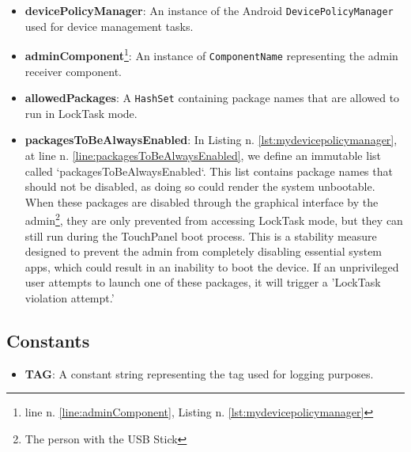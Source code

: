 \begin{itemize}
  \item \textbf{devicePolicyManager}: An instance of the Android \texttt{DevicePolicyManager} used for device management tasks.

  \item \textbf{adminComponent}\footnote{\label{adminComponentLine}line n. \ref{line:adminComponent}, Listing n. \ref{lst:mydevicepolicymanager}}:  An instance of \texttt{ComponentName} representing the admin receiver component.

  \item \textbf{allowedPackages}: A \texttt{HashSet} containing package names that are allowed to run in LockTask mode.
  \item \textbf{packagesToBeAlwaysEnabled}: In Listing n. \ref{lst:mydevicepolicymanager}, at line n. \ref{line:packagesToBeAlwaysEnabled}, we define an immutable list called `packagesToBeAlwaysEnabled`. This list contains package names that should not be disabled, as doing so could render the system unbootable. When these packages are disabled through the graphical interface by the admin\footnote{\label{administrator}The person with the USB Stick}, they are only prevented from accessing LockTask mode, but they can still run during the TouchPanel boot process. This is a stability measure designed to prevent the admin from completely disabling essential system apps, which could result in an inability to boot the device. If an unprivileged user attempts to launch one of these packages, it will trigger a 'LockTask violation attempt.'
\end{itemize}

\subsection{Constants}

\begin{itemize}
  \item \textbf{TAG}: A constant string representing the tag used for logging purposes.
\end{itemize}

\clearpage

